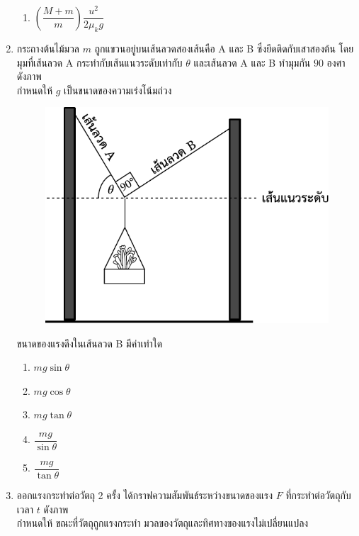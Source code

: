 \documentclass[a4paper, 12pt]{article}
\begin{document}
\begin{enumerate}
\begin{enumerate}
              \item \(\left(\dfrac{M+m}{m}\right)\dfrac{u^2}{2\mu_k g}\)
          \end{enumerate}
          \newpage
    \item กระถางต้นไม้มวล \(m\) ถูกแขวนอยู่บนเส้นลวดสองเส้นคือ A และ B ซึ่งยึดติดกับเสาสองต้น โดยมุมที่เส้นลวด A กระทำกับเส้นแนวระดับเท่ากับ \(\theta\) และเส้นลวด A และ B ทำมุมกัน \(90\) องศา ดังภาพ \\
          กำหนดให้ \(g\) เป็นขนาดของความเร่งโน้มถ่วง \\
          \begin{figure}[H]
              \centering
              \includegraphics{images/7_6.pdf}
          \end{figure}
          ขนาดของแรงดึงในเส้นลวด B มีค่าเท่าใด
          \begin{enumerate}
              \item \(mg\sin\theta\)
              \item \(mg\cos\theta\)
              \item \(mg\tan\theta\)
              \item \(\dfrac{mg}{\sin\theta}\)
              \item \(\dfrac{mg}{\tan\theta}\)
          \end{enumerate}
          \newpage
    \item ออกแรงกระทำต่อวัตถุ 2 ครั้ง ได้กราฟความสัมพันธ์ระหว่างขนาดของแรง \(F\) ที่กระทำต่อวัตถุกับเวลา \(t\) ดังภาพ \\
          กำหนดให้ ขณะที่วัตถุถูกแรงกระทำ มวลของวัตถุและทิศทางของแรงไม่เปลี่ยนแปลง \\

\end{enumerate}
\end{document}
